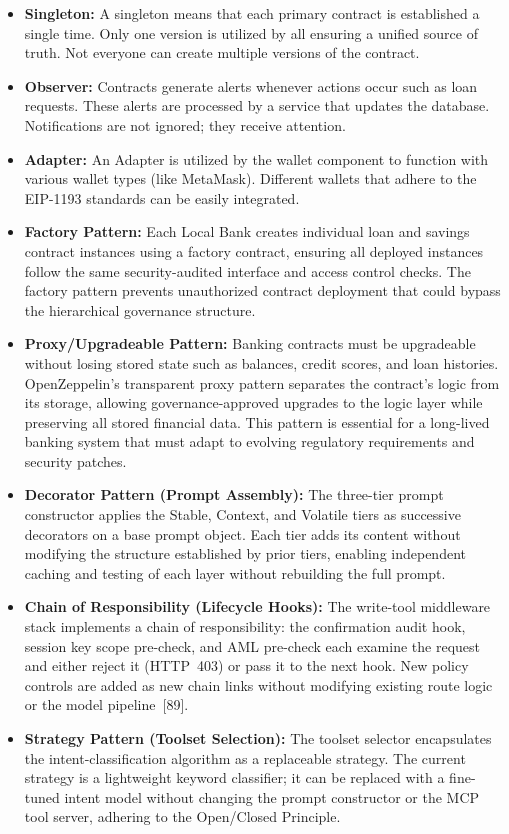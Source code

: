 \documentclass[12pt, a4paper]{report}
\begin{document}
\begin{itemize}[noitemsep]
\item \textbf{Singleton:} A singleton means that each primary contract is established a single time. Only one version is utilized by all ensuring a unified source of truth. Not everyone can create multiple versions of the contract.

\item \textbf{Observer:} Contracts generate alerts whenever actions occur such as loan requests. These alerts are processed by a service that updates the database. Notifications are not ignored; they receive attention.

\item \textbf{Adapter:} An Adapter is utilized by the wallet component to function with various wallet types (like MetaMask). Different wallets that adhere to the EIP-1193 standards can be easily integrated.

\item \textbf{Factory Pattern:} Each Local Bank creates individual loan and savings contract instances using a factory contract, ensuring all deployed instances follow the same security-audited interface and access control checks. The factory pattern prevents unauthorized contract deployment that could bypass the hierarchical governance structure.

\item \textbf{Proxy/Upgradeable Pattern:} Banking contracts must be upgradeable without losing stored state such as balances, credit scores, and loan histories. OpenZeppelin's transparent proxy pattern separates the contract's logic from its storage, allowing governance-approved upgrades to the logic layer while preserving all stored financial data. This pattern is essential for a long-lived banking system that must adapt to evolving regulatory requirements and security patches.

\item \textbf{Decorator Pattern (Prompt Assembly):} The three-tier prompt
constructor applies the Stable, Context, and Volatile tiers as successive
decorators on a base prompt object. Each tier adds its content without modifying
the structure established by prior tiers, enabling independent caching and testing
of each layer without rebuilding the full prompt.

\item \textbf{Chain of Responsibility (Lifecycle Hooks):} The write-tool middleware
stack implements a chain of responsibility: the confirmation audit hook, session
key scope pre-check, and AML pre-check each examine the request and either reject
it (HTTP~403) or pass it to the next hook. New policy controls are added as new
chain links without modifying existing route logic or the model
pipeline~[89].

\item \textbf{Strategy Pattern (Toolset Selection):} The toolset selector
encapsulates the intent-classification algorithm as a replaceable strategy. The
current strategy is a lightweight keyword classifier; it can be replaced with a
fine-tuned intent model without changing the prompt constructor or the MCP tool
server, adhering to the Open/Closed Principle.
\end{itemize}
\end{document}
